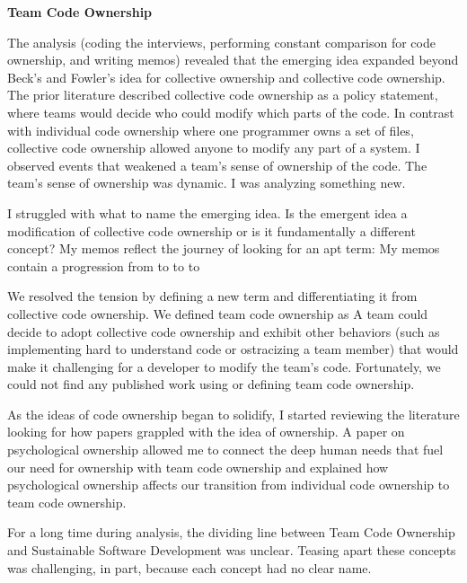 \textbf{Team Code Ownership}

The analysis (coding the interviews, performing constant comparison for code ownership, and writing memos) revealed that the emerging idea expanded beyond Beck’s \cite{BeckExtremeProgramming1999, BeckExtremeProgramming2004} and Fowler’s \cite{FowlerCodeOwnership} idea for collective ownership and collective code ownership. The prior literature described collective code ownership as a policy statement, where teams would decide who could modify which parts of the code. In contrast with individual code ownership where one programmer owns a set of files, collective code ownership allowed anyone to modify any part of a system. I observed events that weakened a team’s sense of ownership of the code. The team’s sense of ownership was dynamic. I was analyzing something new. 

I struggled with what to name the emerging idea. Is the emergent idea a modification of collective code ownership or is it fundamentally a different concept? My memos reflect the  journey of looking for an apt term:  My memos contain a progression from  to  to  to  

We resolved the tension by defining a new term and differentiating it from collective code ownership. We defined team code ownership as  A team could decide to adopt collective code ownership and exhibit other behaviors (such as implementing hard to understand code or ostracizing a team member) that would make it challenging for a developer to modify the team’s code. Fortunately, we could not find any published work using or defining team code ownership.

As the ideas of code ownership began to solidify, I started reviewing the literature looking for how papers grappled with the idea of ownership. A paper on psychological ownership \cite{Pierce2001} allowed me to connect the deep human needs that fuel our need for ownership with team code ownership and explained how psychological ownership affects our transition from individual code ownership to team code ownership.

For a long time during analysis, the dividing line between Team Code Ownership and Sustainable Software Development was unclear. Teasing apart these concepts was challenging, in part, because each concept had no clear name. 

